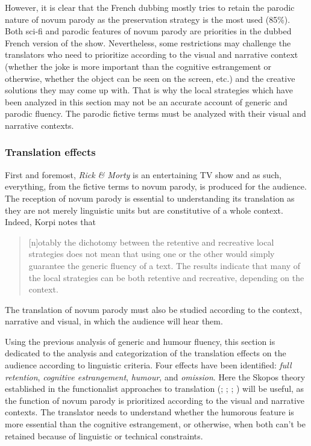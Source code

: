 \documentclass[output=paper]{langscibook}
\begin{document}
However, it is clear that the French dubbing mostly tries to retain the parodic nature of novum parody as the preservation strategy is the most used (85\%). Both sci-fi and parodic features of novum parody are priorities in the dubbed French version of the show. Nevertheless, some restrictions may challenge the translators who need to prioritize according to the visual and narrative context (whether the joke is more important than the cognitive estrangement or otherwise, whether the object can be seen on the screen, etc.) and the creative solutions they may come up with. That is why the local strategies which have been analyzed in this section may not be an accurate account of generic and parodic fluency. The parodic fictive terms must be analyzed with their visual and narrative contexts.

\subsubsection{Translation effects}

First and foremost, \textit{Rick \& Morty} is an entertaining TV show and as such, everything, from the fictive terms to novum parody, is produced for the audience. The reception of novum parody is essential to understanding its translation as they are not merely linguistic units but are constitutive of a whole context. Indeed, Korpi notes that

\begin{quote}{}
[n]otably the dichotomy between the retentive and recreative local strategies does not mean that using one or the other would simply guarantee the generic fluency of a text. The results indicate that many of the local strategies can be both retentive and recreative, depending on the context. \citep[94]{Korpi2017}
\end{quote}

 The translation of novum parody must also be studied according to the context, narrative and visual, in which the audience will hear them.

Using the previous analysis of generic and humour fluency, this section is dedicated to the analysis and categorization of the translation effects on the audience according to linguistic criteria. Four effects have been identified: \textit{full retention}, \textit{cognitive estrangement}, \textit{humour}, and \textit{omission}. Here the Skopos theory established in the functionalist approaches to translation (\citealt{ReissVermeer1984}; \citealt{Reiss1997}; \citealt{Vermeer2012}; \citealt{Nord2020}) will be useful, as the function of novum parody is prioritized according to the visual and narrative contexts. The translator needs to understand whether the humorous feature is more essential than the cognitive estrangement, or otherwise, when both can’t be retained because of linguistic or technical constraints.
\end{document}
